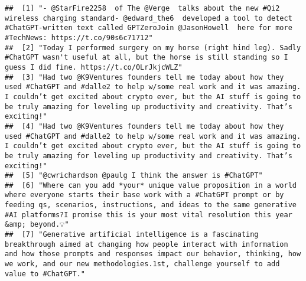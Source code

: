 \documentclass[
]{article}
\newenvironment{Shaded}{\begin{snugshade}}{\end{snugshade}}
\newcommand{\FunctionTok}[1]{\textcolor[rgb]{0.00,0.00,0.00}{#1}}
\newcommand{\NormalTok}[1]{#1}
\newcommand{\SpecialCharTok}[1]{\textcolor[rgb]{0.00,0.00,0.00}{#1}}
\newcommand{\StringTok}[1]{\textcolor[rgb]{0.31,0.60,0.02}{#1}}
\begin{document}
\begin{Shaded}
\end{Shaded}

\begin{verbatim}
##  [1] "- @StarFire2258  of The @Verge  talks about the new #Qi2 wireless charging standard- @edward_the6  developed a tool to detect #ChatGPT-written text called GPTZeroJoin @JasonHowell  here for more #TechNews: https://t.co/90s6c71712"                                                                         
##  [2] "Today I performed surgery on my horse (right hind leg). Sadly #ChatGPT wasn't useful at all, but the horse is still standing so I guess I did fine. https://t.co/0LrJkjcWLZ"                                                                                                                                   
##  [3] "Had two @K9Ventures founders tell me today about how they used #ChatGPT and #dalle2 to help w/some real work and it was amazing. I couldn’t get excited about crypto ever, but the AI stuff is going to be truly amazing for leveling up productivity and creativity. That’s exciting!"                        
##  [4] "Had two @K9Ventures founders tell me today about how they used #ChatGPT and #dalle2 to help w/some real work and it was amazing. I couldn’t get excited about crypto ever, but the AI stuff is going to be truly amazing for leveling up productivity and creativity. That’s exciting!"                        
##  [5] "@cwrichardson @paulg I think the answer is #ChatGPT"                                                                                                                                                                                                                                                           
##  [6] "Where can you add *your* unique value proposition in a world where everyone starts their base work with a #ChatGPT prompt or by feeding qs, scenarios, instructions, and ideas to the same generative #AI platforms?I promise this is your most vital resolution this year &amp; beyond.💡"                    
##  [7] "Generative artificial intelligence is a fascinating breakthrough aimed at changing how people interact with information and how those prompts and responses impact our behavior, thinking, how we work, and our new methodologies.1st, challenge yourself to add value to #ChatGPT."                           

\end{verbatim}
\end{document}
